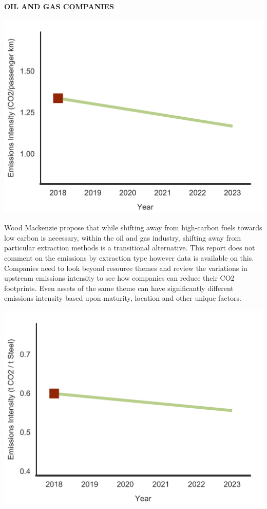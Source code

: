 \documentclass[10pt,twoside,table]{article}\usepackage[]{graphicx}\usepackage[]{color}
\begin{document}
\begin{center}
	\textbf{OIL AND GAS COMPANIES}
	
	\includegraphics[trim = {0 0cm 0 0},width=1\linewidth]{CAFigures/Fig32}
\end{center}

Wood Mackenzie propose that while shifting away from high-carbon fuels towards low carbon is necessary, within the oil and gas industry, shifting away from particular extraction methods is a transitional alternative. This report does not comment on the emissions by extraction type however data is available on this. Companies need to look beyond resource themes and review the variations in upstream emissions intensity to see how companies can reduce their  CO2 footprints. Even assets of the same theme can have significantly different emissions intensity based upon maturity, location and other unique factors.


\begin{center}
	
	\includegraphics[trim = {0 0cm 0 0},width=1\linewidth]{CAFigures/Fig31}
\end{center}
\end{document}
